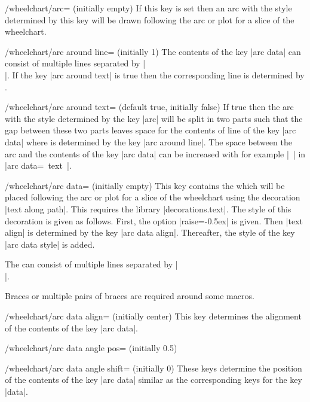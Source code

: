 \documentclass[a4paper,english,dvipsnames]{ltxdoc}
\begin{document}
\begin{stylekey}{/wheelchart/arc= (initially \normalfont empty)}
If this key is set then an arc with the style determined by this key will be drawn following the arc or plot for a slice of the wheelchart.
\end{stylekey}
\begin{key}{/wheelchart/arc around line= (initially 1)}
The contents of the key |arc data| can consist of multiple lines separated by |\\|. If the key |arc around text| is true then the corresponding line is determined by .
\end{key}
\begin{key}{/wheelchart/arc around text= (default true, initially false)}
If true then the arc with the style determined by the key |arc| will be split in two parts such that the gap between these two parts leaves space for the contents of line  of the key |arc data| where  is determined by the key |arc around line|. The space between the arc and the contents of the key |arc data| can be increased with for example |~| in |arc data=~text~|.
\end{key}
\begin{key}{/wheelchart/arc data= (initially \normalfont empty)}
This key contains the  which will be placed following the arc or plot for a slice of the wheelchart using the decoration |text along path|. This requires the \tikzname{} library |decorations.text|. The style of this decoration is given as follows. First, the option |raise=-0.5ex| is given. Then |text align| is determined by the key |arc data align|. Thereafter, the style of the key |arc data style| is added.

The  can consist of multiple lines separated by |\\|.

Braces or multiple pairs of braces are required around some macros.
\end{key}
\begin{key}{/wheelchart/arc data align= (initially center)}
This key determines the alignment of the contents of the key |arc data|.
\end{key}
\begin{key}{/wheelchart/arc data angle pos= (initially 0.5)}
\end{key}
\begin{key}{/wheelchart/arc data angle shift= (initially 0)}
These keys determine the position of the contents of the key |arc data| similar as the corresponding keys for the key |data|.
\end{key}
\end{document}
